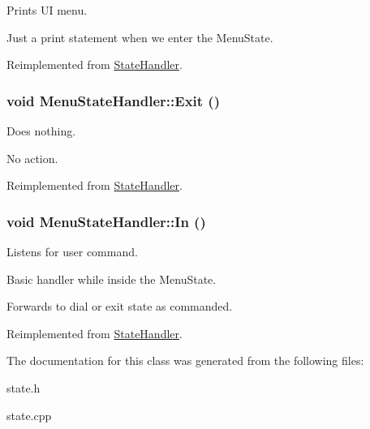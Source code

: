 Prints UI menu. 

Just a print statement when we enter the MenuState.

Reimplemented from \hyperlink{classStateHandler_c08036e743cf5172d6931cf3b6d321c6}{StateHandler}.\hypertarget{classMenuStateHandler_57ad1a8b97f4a4aabe30ea007c8afa73}{
\subsubsection[{Exit}]{\setlength{\rightskip}{0pt plus 5cm}void MenuStateHandler::Exit ()}}
\label{classMenuStateHandler_57ad1a8b97f4a4aabe30ea007c8afa73}


Does nothing. 

No action.

Reimplemented from \hyperlink{classStateHandler_5ce0f2cb3d4a9f5aca137d47eac75c1e}{StateHandler}.\hypertarget{classMenuStateHandler_4254cddbdf883ec3efb2e1d0329d2200}{
\subsubsection[{In}]{\setlength{\rightskip}{0pt plus 5cm}void MenuStateHandler::In ()}}
\label{classMenuStateHandler_4254cddbdf883ec3efb2e1d0329d2200}


Listens for user command. 

Basic handler while inside the MenuState.

Forwards to dial or exit state as commanded. 

Reimplemented from \hyperlink{classStateHandler_cee16f855e7354d21abafa47acd1046c}{StateHandler}.

The documentation for this class was generated from the following files:\begin{CompactItemize}
\item 
state.h\item 
state.cpp\end{CompactItemize}
